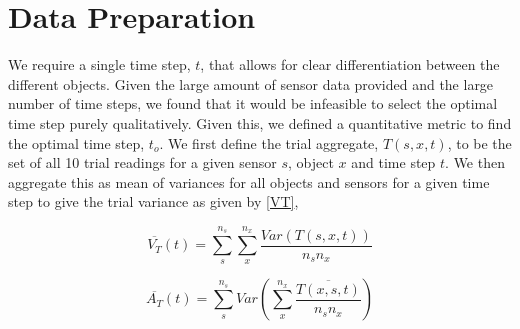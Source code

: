 \section{Data Preparation}

We require a single time step, $t$, that allows for clear differentiation between the different objects. Given the large amount of sensor data provided and the large number of time steps, we found that it would be infeasible to select the optimal time step purely qualitatively. Given this, we defined a quantitative metric to find the optimal time step, $t_o$. We first define the trial aggregate, $T\left(s, x, t\right)$, to be the set of all 10 trial readings for a given sensor $s$, object $x$ and time step $t$. We then aggregate this as mean of variances for all objects and sensors for a given time step to give the trial variance as given by \autoref{VT},

\begin{equation}
    \overline{V_T}(t) = \sum_{s}^{n_s} \sum_{x}^{n_x} \frac{Var\left(T\left(s, x, t\right)\right)}{n_sn_x}
    \label{VT}
\end{equation}

\begin{equation}
    \overline{A_T}(t) = \sum_{s}^{n_s} Var\left(\sum_{x}^{n_x} \frac{\overline{T\left(x, s, t\right)}}{n_sn_x}\right)
    \label{AA}
\end{equation}
